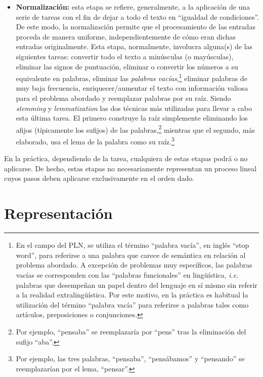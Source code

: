 \begin{itemize}
    \item\textbf{Normalización:} esta etapa se refiere, generalmente, a la aplicación de una serie de tareas con el fin de dejar a todo el texto en ``igualdad de condiciones''.
    De este modo, la normalización permite que el procesamiento de las entradas proceda de manera uniforme, independientemente de cómo eran dichas entradas originalmente.
    Esta etapa, normalmente, involucra alguna(s) de las siguientes tareas: convertir todo el texto a minúsculas (o mayúsculas), eliminar las signos de puntuación, eliminar o convertir los números a su equivalente en palabras, eliminar las \emph{palabras vacías},\footnote{En el campo del \ac{PLN}, se utiliza el término ``palabra vacía'', en inglés ``stop word'', para referirse a una palabra que carece de semántica en relación al problema abordado. A excepción de problemas muy específicos, las palabras vacías se corresponden con las ``palabras funcionales'' en lingüística, \emph{i.e.} palabras que desempeñan un papel dentro del lenguaje en sí mismo sin referir a la realidad extralingüística. Por este motivo, en la práctica es habitual la utilización del término ``palabra vacía'' para referirse a palabras tales como artículos, preposiciones o conjunciones.} eliminar palabras de muy baja frecuencia, enriquecer/aumentar el texto con información valiosa para el problema abordado y reemplazar palabras por su raíz.
    Siendo \emph{stemming} y \emph{lemmatization} las dos técnicas más utilizadas para llevar a cabo esta última tarea.
    El primero construye la raíz simplemente eliminando los afijos (típicamente los sufijos) de las palabras,\footnote{Por ejemplo, ``pensaba'' se reemplazaría por ``pens'' tras la eliminación del sufijo ``aba''.} mientras que el segundo, más elaborado, usa el lema de la palabra como su raíz.\footnote{Por ejemplo, las tres palabras, ``pensaba'', ``pensábamos'' y ``pensando'' se reemplazarían por el lema, ``pensar''.}
\end{itemize}


En la práctica, dependiendo de la tarea, cualquiera de estas etapas podrá o no aplicarse. De hecho, estas etapas no necesariamente representan un proceso lineal cuyos pasos deben aplicarse exclusivamente en el orden dado.

\section{Representación}
\label{sec:representacion}

